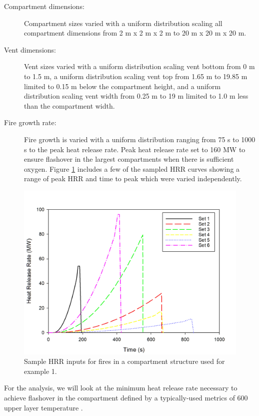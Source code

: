 \documentclass[12pt,twoside]{book}
\begin{document}
\begin{description}
\item[Compartment dimensions:] Compartment sizes varied with a uniform distribution scaling all compartment dimensions from 2 m x 2 m x 2 m to 20 m x 20 m x 20 m.
\item[Vent dimensions:] Vent sizes varied with a uniform distribution scaling vent bottom from 0 m to 1.5 m, a uniform distribution scaling vent top from 1.65 m to 19.85 m limited to 0.15 m below the compartment height, and a uniform distribution scaling vent width from 0.25 m to 19 m limited to 1.0 m less than the compartment width.
\item[Fire growth rate:] Fire growth is varied with a uniform distribution ranging from 75 s to 1000 s to the peak heat release rate. Peak heat release rate set to 160 MW to ensure flashover in the largest compartments when there is sufficient oxygen. Figure \ref{flashover_fires} includes a few of the sampled HRR curves showing a range of peak HRR and time to peak which were varied independently.
\end{description}

\begin{figure}[h!]
\centering
\includegraphics[width=4.5in]{FIGURES/Flashover_HRR_Samples.jpg}
\caption{Sample HRR inputs for fires in a compartment structure used for example 1.}
\label{flashover_fires}
\end{figure}

For the analysis, we will look at the minimum heat release rate necessary to achieve flashover in the compartment defined by a typically-used metrics of 600 \degc upper layer temperature \cite{Valid:Peacock_Flashover_1} \cite{Valid:Peacock_Flashover_2}.
\end{document}
